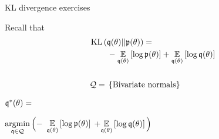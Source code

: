 \begin{frame}{KL divergence exercises}
\begin{minipage}{0.5\textwidth}
%
Recall that
\begin{align*}
%
\MoveEqLeft
\kl{\q(\theta)}{\p(\theta)} ={}\\&
-\expect{\q(\theta)}{\log \p(\theta)} +
\expect{\q(\theta)}{\log \q(\theta)}\\
\\
\qdom ={}& \left\{ \textrm{Bivariate normals}\right\}
%
\end{align*}

\hspace{-2em}$\mathfrak{q}^*(\theta) = $

$\underset{\mathfrak{q} \in \mathcal{Q}}{\mathrm{argmin}}\, \Big(-$
\sout{$\underset{\mathfrak{q}(\theta)}{\mathbb{E}}\left[\log \mathfrak{p}(\theta)\right]$}
$+ \underset{\mathfrak{q}(\theta)}{\mathbb{E}}\left[\log \mathfrak{q}(\theta)\right] \Big)$
%
\end{minipage}
%
\begin{minipage}{0.4\textwidth}

\end{minipage}

\end{frame}
